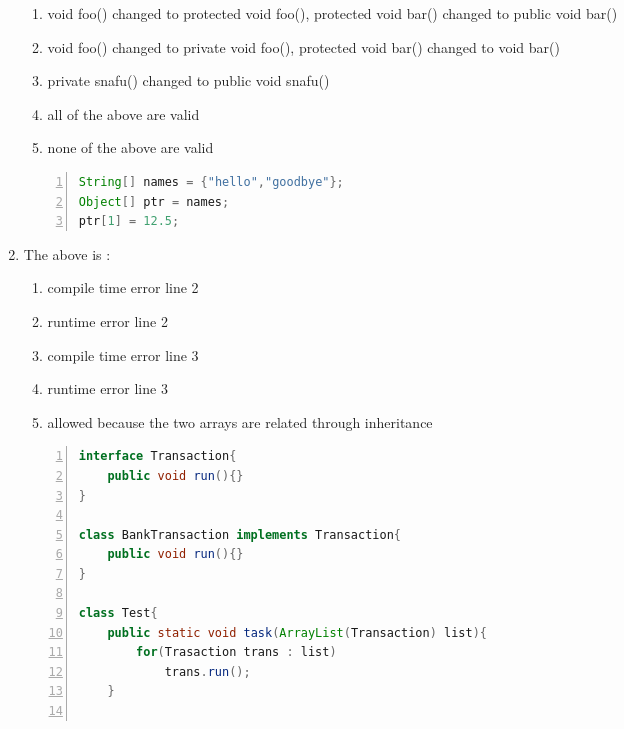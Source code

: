 \documentclass{article}
\begin{document}
\begin{enumerate}
	\begin{enumerate}
		\item void foo(){} changed to protected void foo(){}, protected void bar(){} changed to public void bar(){}
		\item void foo(){} changed to private void foo(){}, protected void bar(){} changed to void bar(){}
		\item private snafu(){} changed to public void snafu(){}
		\item all of the above are valid
		\item none of the above are valid
	\end{enumerate}
	\begin{lstlisting}[language=Java, numbers=left]
String[] names = {"hello","goodbye"};
Object[] ptr = names;
ptr[1] = 12.5;
	\end{lstlisting}
	\item The above is :
	\begin{enumerate}
		\item compile time error line 2
		\item runtime error line 2
		\item compile time error line 3
		\item runtime error line 3
		\item allowed because the two arrays are related through inheritance
	\end{enumerate}
	\begin{lstlisting}[language=Java, numbers=left]
interface Transaction{
	public void run(){}
}

class BankTransaction implements Transaction{
	public void run(){}
}

class Test{
	public static void task(ArrayList(Transaction) list){
		for(Trasaction trans : list)
			trans.run();
	}
	

\end{lstlisting}
\end{enumerate}
\end{document}
